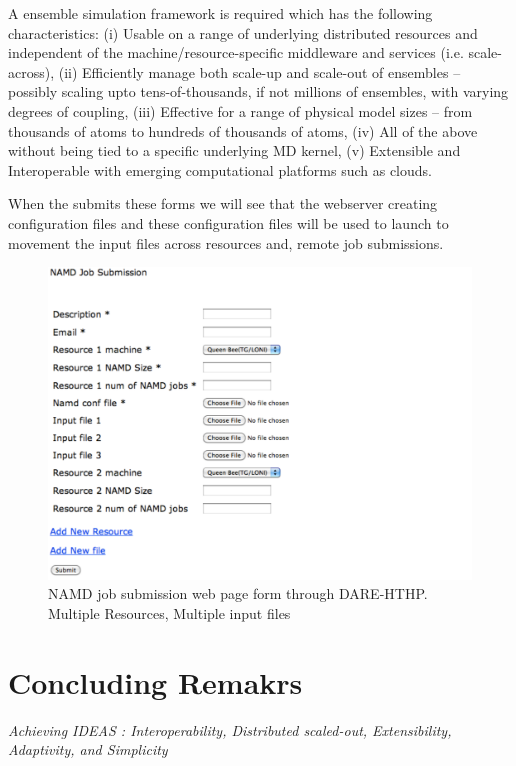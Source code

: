 \documentclass{sig-alternate}
\begin{document}
A ensemble simulation framework is required which has the following
characteristics: (i) Usable on a range of underlying distributed
resources and independent of the machine/resource-specific middleware
and services (i.e. scale-across), (ii) Efficiently manage both
scale-up and scale-out of ensembles -- possibly scaling upto
tens-of-thousands, if not millions of ensembles, with varying degrees
of coupling, (iii) Effective for a range of physical model sizes --
from thousands of atoms to hundreds of thousands of atoms, (iv) All of
the above without being tied to a specific underlying MD kernel, (v)
Extensible and Interoperable with emerging computational platforms such
as clouds.


When the submits these forms we will see that the webserver creating configuration files and 
these configuration files will be used to launch to movement the input files across resources and,
remote job submissions.

\begin{figure}
 \centering
\includegraphics[scale=0.35]{figures/NAMD2.pdf}

\caption{\small NAMD job submission web page form through DARE-HTHP. Multiple Resources, Multiple input files }
  \label{fig:NAMD2}
\end{figure}


\section{Concluding Remakrs}

\textit{Achieving IDEAS : Interoperability, Distributed
  scaled-out, Extensibility, Adaptivity, and Simplicity}
\end{document}
